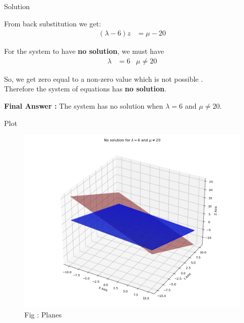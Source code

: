 \documentclass{beamer}
\numberwithin{equation}{section}
\theoremstyle{remark}
\begin{document}
\begin{frame}{Solution}

From back substitution we get:
\begin{align}
(\lambda-6)z &= \mu-20
\end{align}

For the system to have \textbf{no solution}, we must have
\begin{align}
  \lambda &= 6 & \mu \neq 20
\end{align}

So, we get zero equal to a non-zero value which is not possible .\\
Therefore the system of equations has \textbf{no solution}.

\textbf{Final Answer :} The system has no solution when $\lambda=6$ and $\mu \neq 20$.

\end{frame}

\begin{frame}{Plot}

\begin{figure}[h!]
  \centering
  \includegraphics[width=0.8\columnwidth]{figs/planes.png} 
   \caption*{Fig : Planes}
  \label{Fig1}
\end{figure}

\end{frame}
\end{document}
